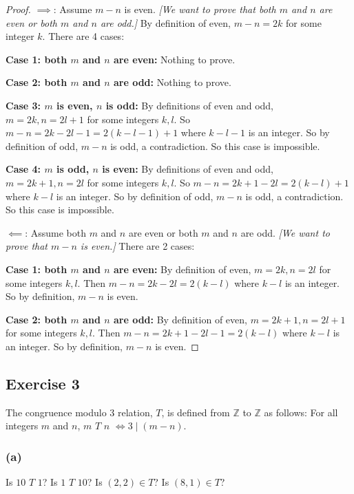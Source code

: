 \documentclass[14pt]{extarticle}
\newcommand{\Z}{\mathbb{Z}}
\begin{document}
\begin{proof}
        \(\bm{\implies}\): Assume $m-n$ is even. {\it [We want to prove that both $m$ and $n$ are even or both $m$ and $n$
                                are odd.]} By definition of even, \(m - n = 2k\) for some integer $k$. There are 4 cases:

        {\bf Case 1: both $m$ and $n$ are even:} Nothing to prove.

                {\bf Case 2: both $m$ and $n$ are odd:} Nothing to prove.

                {\bf Case 3: $m$ is even, $n$ is odd:} By definitions of even and odd, \(m=2k, n=2l+1\) for some integers $k,l$.
        So \(m-n = 2k-2l-1 = 2(k-l-1) + 1\) where \(k-l-1\) is an integer. So by definition of odd, \(m-n\) is odd, a
        contradiction. So this case is impossible.

                {\bf Case 4: $m$ is odd, $n$ is even:} By definitions of even and odd, \(m=2k+1, n=2l\) for some integers $k,l$.
        So \(m-n = 2k+1-2l = 2(k-l) + 1\) where \(k-l\) is an integer. So by definition of odd, \(m-n\) is odd, a
        contradiction. So this case is impossible.

        \(\bm{\impliedby}\): Assume both $m$ and $n$ are even or both $m$ and $n$ are odd. {\it [We want to prove that $m-n$
                                is even.]} There are 2 cases:

        {\bf Case 1: both $m$ and $n$ are even:} By definition of even, \(m = 2k, n = 2l\) for some integers $k,l$. Then
        \(m-n = 2k-2l = 2(k-l)\) where $k-l$ is an integer. So by definition, $m-n$ is even.

                {\bf Case 2: both $m$ and $n$ are odd:} By definition of even, \(m = 2k+1, n = 2l+1\) for some integers $k,l$. Then
        \(m-n = 2k+1-2l-1 = 2(k-l)\) where $k-l$ is an integer. So by definition, $m-n$ is even.
\end{proof}

\subsection{Exercise 3}
The congruence modulo 3 relation, $T$, is defined from $\Z$ to $\Z$ as follows: For all integers $m$ and $n$, $m$ $T$
$n$ \(\iff 3 \mid (m - n)\).

\subsubsection{(a)}
Is $10$ $T$ $1$? Is $1$ $T$ $10$? Is \((2, 2) \in T\)? Is \((8, 1) \in T\)?
\end{document}

